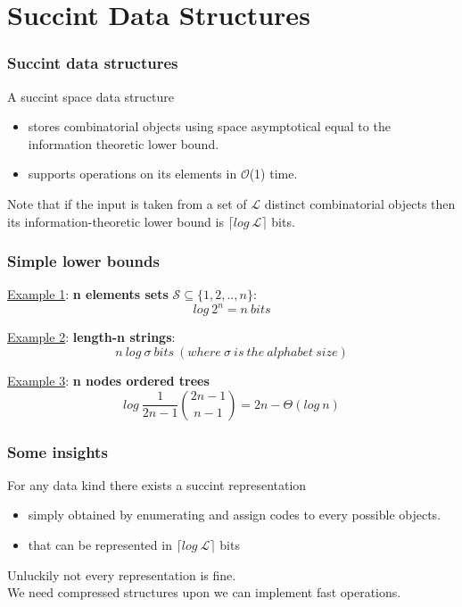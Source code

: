 \section{Succint Data Structures}

\begin{frame}
\frametitle{Succint data structures}
A succint space data structure 
\begin{itemize}
	\item stores combinatorial objects using space asymptotical equal to the information theoretic lower bound.
	\item supports operations on its elements in $\mathcal{O}$(1) time.
\end{itemize}
\medskip
Note that if the input is taken from a set of $\mathcal{L}$ distinct combinatorial objects then its information-theoretic lower bound is $\lceil log\ \mathcal{L}\rceil $ bits.
\end{frame}

\begin{frame}
\frametitle{Simple lower bounds}
\underline{Example 1}: \textbf{n elements sets} $\mathcal{S} \subseteq \{1, 2, .., n\}$:
\[ log\ 2^n = n\ bits \]

\medskip

\underline{Example 2}: \textbf{length-n strings}:
\[ n\ log\ \sigma\ bits\ (where\ \sigma\ is\ the\ alphabet\ size) \]

\underline{Example 3}: \textbf{n nodes ordered trees}
\[ log\ \frac{1}{2n-1} \binom{2n-1}{n-1} = 2n - \Theta(log\ n) \]
\end{frame}


\begin{frame}
\frametitle{Some insights}
For any data kind there exists a succint representation 
\begin{itemize}
	\item simply obtained by enumerating and assign codes to every possible objects.
	\item that can be represented in $\lceil log\ \mathcal{L} \rceil$ bits
\end{itemize}
Unluckily not every representation is fine.\\
We need compressed structures upon we can implement fast operations.
\end{frame}

